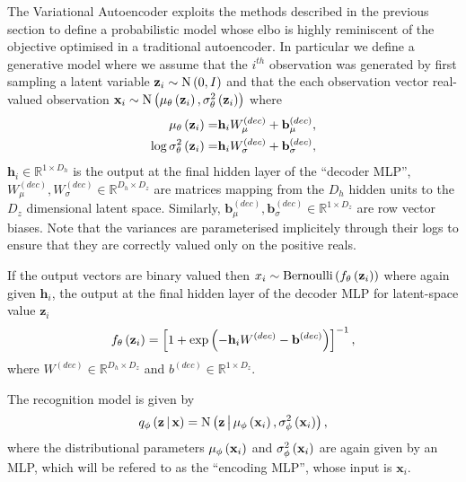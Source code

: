 \documentclass[../report.tex]{subfiles}
\begin{document}
The Variational Autoencoder exploits the methods described in the previous section to define a probabilistic model whose elbo is highly reminiscent of the objective optimised in a traditional autoencoder. In particular we define a generative model where we assume that the $i^{th}$ observation was generated by first sampling a latent variable $\mathbf{z}_i \sim \textrm{N} \left( 0, I\right)$ and that the each observation vector real-valued observation $\mathbf{x}_i \sim \textrm{N} \left( \mu_\theta \left( \mathbf{z}_i\right), \sigma^2_\theta \left( \mathbf{z}_i\right)\right)$ where
\begin{align}
  \mathbf{\mu}_\theta \left( \mathbf{z}_i\right) =& \mathbf{h}_i W_\mathbf{\mu}^{(dec)} + \mathbf{b}_\mathbf{\mu}^{(dec)}, \\
  \log \sigma^2_\theta \left( \mathbf{z}_i\right) =& \mathbf{h}_i W_\sigma^{(dec)} + \mathbf{b}_\sigma^{(dec)},
\end{align}
$\mathbf{h}_i \in \mathbb{R}^{1 \times D_h}$ is the output at the final hidden layer of the ``decoder MLP'', $W_\mu^{(dec)}, W_\sigma^{(dec)} \in \mathbb{R}^{D_h \times D_z}$ are matrices mapping from the $D_h$ hidden units to the $D_z$ dimensional latent space. Similarly, $\mathbf{b}_\mu^{(dec)}, \mathbf{b}_\sigma^{(dec)} \in \mathbb{R}^{1 \times D_z}$ are row vector biases. Note that the variances are parameterised implicitely through their logs to ensure that they are correctly valued only on the positive reals.

If the output vectors are binary valued then $x_i \sim \textrm{Bernoulli} \left( f_\theta \left( \mathbf{z}_i\right)\right)$ where again given $\mathbf{h}_i$, the output at the final hidden layer of the decoder MLP for latent-space value $\mathbf{z}_i$
\begin{equation}
  f_\theta \left( \mathbf{z}_i\right) = \left[1 + \exp \left( - \mathbf{h}_i W^{(dec)} - \mathbf{b}^{(dec)}\right) \right]^{-1},
\end{equation}
where $W^{(dec)} \in \mathbb{R}^{D_h \times D_z}$ and $b^{(dec)} \in \mathbb{R}^{1 \times D_z}$.

The recognition model is given by
\begin{equation}
  q_\phi \left(\mathbf{z} \, \middle\vert \, \mathbf{x} \right) = \textrm{N} \left(\mathbf{z} \, \middle\vert \, \mu_\phi \left( \mathbf{x}_i\right), \sigma_\phi^2 \left( \mathbf{x}_i\right) \right),
\end{equation}
where the distributional parameters $\mu_\phi \left( \mathbf{x}_i\right)$ and $\sigma_\phi^2 \left( \mathbf{x}_i\right)$ are again given by an MLP, which will be refered to as the ``encoding MLP'', whose input is $\mathbf{x}_i$.
\end{document}
